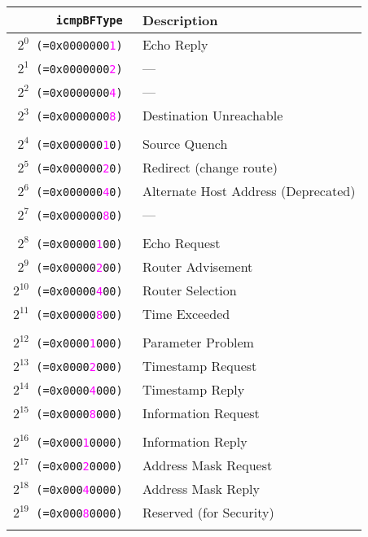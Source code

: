 \documentclass[documentation]{subfiles}
\begin{document}
\begin{longtable}{>{\tt}rl}
    \toprule
    {\bf icmpBFType} & {\bf Description} \\
    \midrule\endhead%
    $2^{0}$  (=0x0000000\textcolor{magenta}{1}) & Echo Reply \\
    $2^{1}$  (=0x0000000\textcolor{magenta}{2}) & --- \\
    $2^{2}$  (=0x0000000\textcolor{magenta}{4}) & --- \\
    $2^{3}$  (=0x0000000\textcolor{magenta}{8}) & Destination Unreachable \\
    \\
    $2^{4}$  (=0x000000\textcolor{magenta}{1}0) & Source Quench \\
    $2^{5}$  (=0x000000\textcolor{magenta}{2}0) & Redirect (change route) \\
    $2^{6}$  (=0x000000\textcolor{magenta}{4}0) & Alternate Host Address (Deprecated) \\
    $2^{7}$  (=0x000000\textcolor{magenta}{8}0) & --- \\
    \\
    $2^{8}$  (=0x00000\textcolor{magenta}{1}00) & Echo Request \\
    $2^{9}$  (=0x00000\textcolor{magenta}{2}00) & Router Advisement \\
    $2^{10}$ (=0x00000\textcolor{magenta}{4}00) & Router Selection \\
    $2^{11}$ (=0x00000\textcolor{magenta}{8}00) & Time Exceeded \\
    \\
    $2^{12}$ (=0x0000\textcolor{magenta}{1}000) & Parameter Problem \\
    $2^{13}$ (=0x0000\textcolor{magenta}{2}000) & Timestamp Request \\
    $2^{14}$ (=0x0000\textcolor{magenta}{4}000) & Timestamp Reply \\
    $2^{15}$ (=0x0000\textcolor{magenta}{8}000) & Information Request \\
    \\
    $2^{16}$ (=0x000\textcolor{magenta}{1}0000) & Information Reply \\
    $2^{17}$ (=0x000\textcolor{magenta}{2}0000) & Address Mask Request \\
    $2^{18}$ (=0x000\textcolor{magenta}{4}0000) & Address Mask Reply \\
    $2^{19}$ (=0x000\textcolor{magenta}{8}0000) & Reserved (for Security)\\
    \\

\end{longtable}
\end{document}

